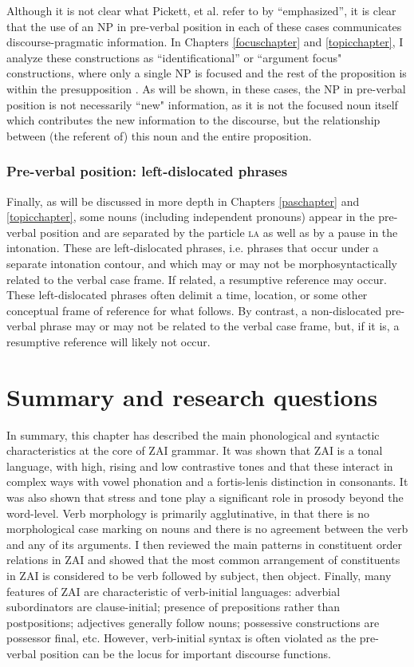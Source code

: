 Although it is not clear what Pickett, et al. refer to by ``emphasized'', it is clear that the use of an NP in pre-verbal position in each of these cases communicates discourse-pragmatic information. In Chapters \ref{focuschapter} and \ref{topicchapter}, I analyze these constructions as ``identificational'' or ``argument focus" constructions, where only a single NP is focused and the rest of the proposition is within the presupposition \citep[228-233]{lambrecht1994}. As will be shown, in these cases, the NP in pre-verbal position is not necessarily ``new" information, as it is not the focused noun itself which contributes the new information to the discourse, but the relationship between (the referent of) this noun and the entire proposition.  


\subsubsection{Pre-verbal position: left-dislocated phrases}
Finally, as will be discussed in more depth in Chapters \ref{paschapter} and \ref{topicchapter}, some nouns (including independent pronouns) appear in the pre-verbal position and are separated by the particle \textsc{la} as well as by a pause in the intonation. These are left-dislocated phrases, i.e. phrases that occur under a separate intonation contour, and which may or may not be morphosyntactically related to the verbal case frame. If related, a resumptive reference may occur. These left-dislocated phrases often delimit a time, location, or some other conceptual frame of reference for what follows. By contrast, a non-dislocated pre-verbal phrase may or may not be related to the verbal case frame, but, if it is, a resumptive reference will likely not occur. 


\section{Summary and research questions}

In summary, this chapter has described the main phonological and syntactic characteristics at the core of ZAI grammar. It was shown that ZAI is a tonal language, with high, rising and low contrastive tones and that these interact in complex ways with vowel phonation and a fortis-lenis distinction in consonants. It was also shown that stress and tone play a significant role in prosody beyond the word-level. Verb morphology is primarily agglutinative, in that there is no morphological case marking on nouns and there is no agreement between the verb and any of its arguments. I then reviewed the main patterns in constituent order relations in ZAI and showed that the most common arrangement of constituents in ZAI is considered to be verb followed by subject, then object. Finally, many features of ZAI are characteristic of verb-initial languages: adverbial subordinators are clause-initial; presence of prepositions rather than postpositions; adjectives generally follow nouns; possessive constructions are possessor final, etc. However, verb-initial syntax is often violated as the pre-verbal position can be the locus for important discourse functions.

